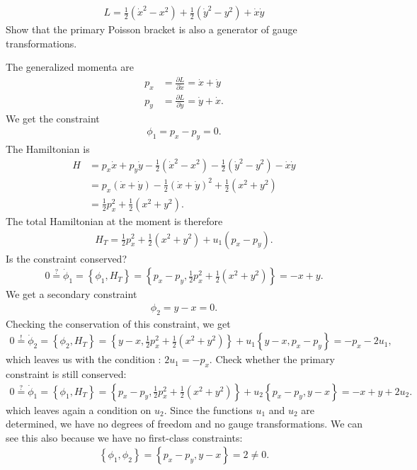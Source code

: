 \begin{exercise}
\begin{align*}
L = \frac{1}{2} (\dot{x}^2 - x^2) + \frac{1}{2} (\dot{y}^2 - y^2) + \dot{x}\dot{y}
\end{align*}
Show that the primary Poisson bracket is also a generator of gauge transformations. 
\end{exercise}
\begin{solution}
The generalized momenta are
\begin{align*}
p_x &= \frac{\partial L}{\partial \dot{x}} = \dot{x} + \dot{y} \\
p_y &= \frac{\partial L}{\partial \dot{y}} = \dot{y} + \dot{x}.
\end{align*}
We get the constraint 
\begin{align*}
\phi_1 = p_x - p_y = 0.
\end{align*}
The Hamiltonian is
\begin{align*}
H &= p_x \dot{x} + p_y \dot{y} - \frac{1}{2} (\dot{x}^2 - x^2) - \frac{1}{2} (\dot{y}^2 - y^2) - \dot{x}\dot{y} \\
&= p_x (\dot{x} + \dot{y}) - \frac{1}{2} (\dot{x} + \dot{y})^2 + \frac{1}{2} (x^2 + y^2) \\
&= \frac{1}{2} p_x^2 + \frac{1}{2} (x^2 + y^2).
\end{align*}
The total Hamiltonian at the moment is therefore
\begin{align*}
H_T = \frac{1}{2} p_x^2 + \frac{1}{2} (x^2 + y^2) + u_1 (p_x - p_y).
\end{align*}
Is the constraint conserved?
\begin{align*}
0 \overset{?}{=} \dot{\phi}_1 = \left \{ \phi_1,H_T \right \} = \left \{ p_x - p_y,\frac{1}{2} p_x^2 + \frac{1}{2} (x^2 + y^2) \right \} = -x + y.
\end{align*}
We get a secondary constraint
\begin{align*}
\phi_2 = y - x = 0.
\end{align*}
Checking the conservation of this constraint, we get
\begin{align*}
0 \overset{!}{=} \dot{\phi}_2 = \left \{ \phi_2,H_T \right \} = \left \{ y - x,\frac{1}{2} p_x^2 + \frac{1}{2} (x^2 + y^2) \right \} + u_1  \left \{ y - x,p_x - p_y \right \} = - p_x - 2 u_1,
\end{align*}
which leaves us with the condition : $2 u_1 = - p_x$. Check whether the primary constraint is still conserved:
\begin{align*}
0 \overset{?}{=} \dot{\phi}_1 = \left \{ \phi_1,H_T \right \} = \left \{ p_x - p_y,\frac{1}{2} p_x^2 + \frac{1}{2} (x^2 + y^2) \right \} + u_2 \left \{ p_x - p_y,y - x \right \} = -x + y + 2 u_2.
\end{align*}
which leaves again a condition on $u_2$. 
Since the functions $u_1$ and $u_2$ are determined, we have no degrees of freedom and no gauge transformations. We can see this also because we have no first-class constraints:
\begin{align*}
\left \{ \phi_1,\phi_2 \right \} = \left \{ p_x - p_y,y - x \right \} = 2 \neq 0.
\end{align*} 


\end{solution}
